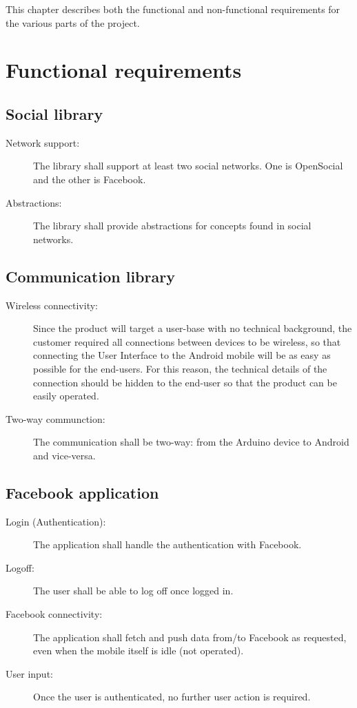 
This chapter describes both the functional and non-functional requirements
for the various parts of the project.

\section{Functional requirements}
	
	\subsection{Social library}
	\begin{description}
		\item[Network support:] The library shall support at least two social networks.
		One is OpenSocial and the other is Facebook.
		\item[Abstractions:] The library shall provide abstractions for concepts found
		in social networks.
		\item[]
	\end{description}
	
	\subsection{Communication library}
	\begin{description}
		\item[Wireless connectivity:] Since the product will target a user-base with
		no technical background, the customer required all connections between
		devices to be wireless, so that connecting the User Interface to the Android
		mobile will be as easy as possible for the end-users. For this reason, the technical
		details of the connection should be hidden to the end-user so that the product can
		be easily operated.
		\item[Two-way communction:] The communication shall be two-way: from the
		Arduino device to Android and vice-versa.
	\end{description}

	\newpage

	\subsection{Facebook application}

	\begin{description}
		\item[Login (Authentication):] The application shall handle the authentication with Facebook.
		\item[Logoff:] The user shall be able to log off once logged in.
		\item[Facebook connectivity:] The application shall fetch and push data
		from/to Facebook as requested, even when the mobile itself is idle (not operated).
		\item[User input:] Once the user is authenticated, no further user action is required.
	\end{description}

